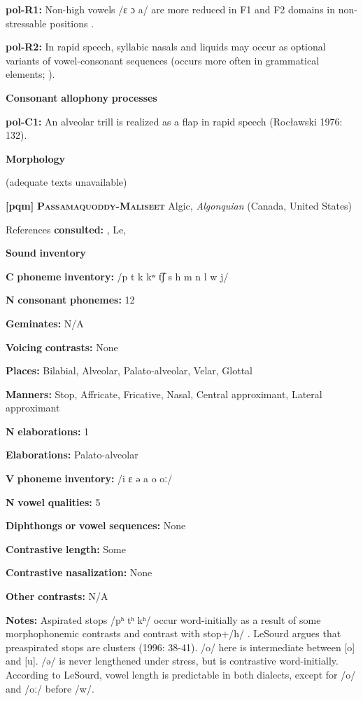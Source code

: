 \textbf{pol-R1:} Non-high vowels /ɛ ɔ a/ are more reduced in F1 and F2 domains in non-stressable positions \citep[378-9]{Nowak2006}.

\textbf{pol-R2:} In rapid speech, syllabic nasals and liquids may occur as optional variants of vowel-consonant sequences (occurs more often in grammatical elements; \citealt{Rubach1974}).

\textbf{Consonant} \textbf{allophony} \textbf{processes}

\textbf{pol-C1:} An alveolar trill is realized as a flap in rapid speech (Rocławski 1976: 132).

\textbf{Morphology}

(adequate texts unavailable)

\textbf{[pqm]}   \textbf{\textsc{Passamaquoddy-Maliseet}}  Algic, \textit{Algonquian} (Canada, United States)

References \textbf{consulted:} \citet{Leavitt1996}, Le\citet{Sourd1993}, \citet{Sherwood1986}

\textbf{Sound} \textbf{inventory}

\textbf{C} \textbf{phoneme} \textbf{inventory:} /p t k kʷ t͡ʃ s h m n l w j/

\textbf{N} \textbf{consonant} \textbf{phonemes:} 12

\textbf{Geminates:} N/A

\textbf{Voicing} \textbf{contrasts:} None

\textbf{Places:} Bilabial, Alveolar, Palato-alveolar, Velar, Glottal

\textbf{Manners:} Stop, Affricate, Fricative, Nasal, Central approximant, Lateral approximant

\textbf{N} \textbf{elaborations:} 1

\textbf{Elaborations:} Palato-alveolar

\textbf{V} \textbf{phoneme} \textbf{inventory:} /i ɛ ə a o oː/

\textbf{N} \textbf{vowel} \textbf{qualities:} 5

\textbf{Diphthongs} \textbf{or} \textbf{vowel} \textbf{sequences:} None

\textbf{Contrastive} \textbf{length:} Some

\textbf{Contrastive} \textbf{nasalization:} None

\textbf{Other} \textbf{contrasts:} N/A

\textbf{Notes:} Aspirated stops /pʰ tʰ kʰ/ occur word-initially as a result of some morphophonemic contrasts and contrast with stop+/h/ \citep{Sherwood1986}. LeSourd argues that preaspirated stops are clusters (1996: 38-41). /o/ here is intermediate between [o] and [u]. /ə/ is never lengthened under stress, but is contrastive word-initially. According to LeSourd, vowel length is predictable in both dialects, except for /o/ and /oː/ before /w/.

